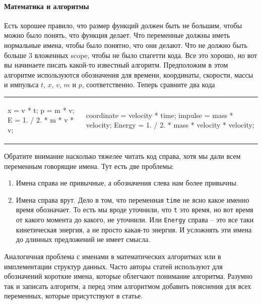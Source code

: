 \paragraph{Математика и алгоритмы}

Есть хорошее правило, что размер функций должен быть не большим, чтобы можно было понять, что функция делает.
Что переменные должны иметь нормальные имена, чтобы было понятно, что они делают.
Что не должно быть больше $3$ вложенных scope, чтобы не было спагетти кода.
Все это хорошо, но вот вы начинаете писать какой-то известный алгоритм.
Предположим в этом алгоритме используются обозначения для времени, координаты, скорости, массы и импульса $t$, $x$, $v$, $m$ и $p$, соответственно.
Теперь сравните два кода
\begin{center}
\begin{tabular}{ll}
{
\begin{minipage}[\baselineskip]{8cm}
\begin{cppcode}[numbers = none]
x = v * t;
p = m * v;
E = 1. / 2. * m * v * v;
\end{cppcode}
\end{minipage}
}&{
\begin{minipage}[\baselineskip]{9cm}
\begin{cppcode}[numbers = none]
coordinate = velocity * time;
impulse = mass * velocity;
Energy = 1. / 2. * mass * velocity * velocity;
\end{cppcode}
\end{minipage}
}\\
\end{tabular}
\end{center}
Обратите внимание насколько тяжелее читать код справа, хотя мы дали всем переменным говорящие имена.
Тут есть две проблемы:
\begin{enumerate}
\item Имена справа не привычные, а обозначения слева нам более привычны.

\item Имена справа врут.
Дело в том, что переменная \verb"time" не ясно какое именно время обозначает.
То есть мы вроде уточнили, что \verb"t" это время, но вот время от какого момента до какого, не уточнили.
Или \verb"Energy" справа -- это все таки кинетическая энергия, а не просто какая-то энергия.
И усложнять эти имена до длинных предложений не имеет смысла.
\end{enumerate}
Аналогичная проблема с именами в математических алгоритмах или в имплементации структур данных.
Часто авторы статей используют для обозначений короткие имена, которые облегчают понимание алгоритма.
Разумно так и записать алгоритм, а перед этим алгоритмом добавить пояснения для всех переменных, которые присутствуют в статье.

